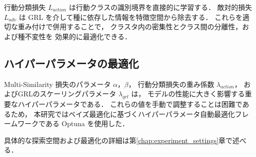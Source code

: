 行動分類損失 $L_{action}$ は行動クラスの識別境界を直接的に学習する．
敵対的損失 $L_{adv}$ は GRL を介して種に依存した情報を特徴空間から除去する．
これらを適切な重み付けで併用することで，
クラスタ内の密集性とクラス間の分離性，および種不変性を
効果的に最適化できる．

\subsection{ハイパーパラメータの最適化}
Multi-Similarity 損失のパラメータ $\alpha$，$\beta$，
行動分類損失の重み係数 $\lambda_{action}$，
およびGRLのスケーリングパラメータ $\lambda_{grl}$ は，
モデルの性能に大きく影響する重要なハイパーパラメータである．
これらの値を手動で調整することは困難であるため，
本研究ではベイズ最適化に基づくハイパーパラメータ自動最適化フレームワークである
Optuna \cite{akiba2019optuna} を使用した．

具体的な探索空間および最適化の詳細は第\ref{chap:experiment_settings}章で述べる．
